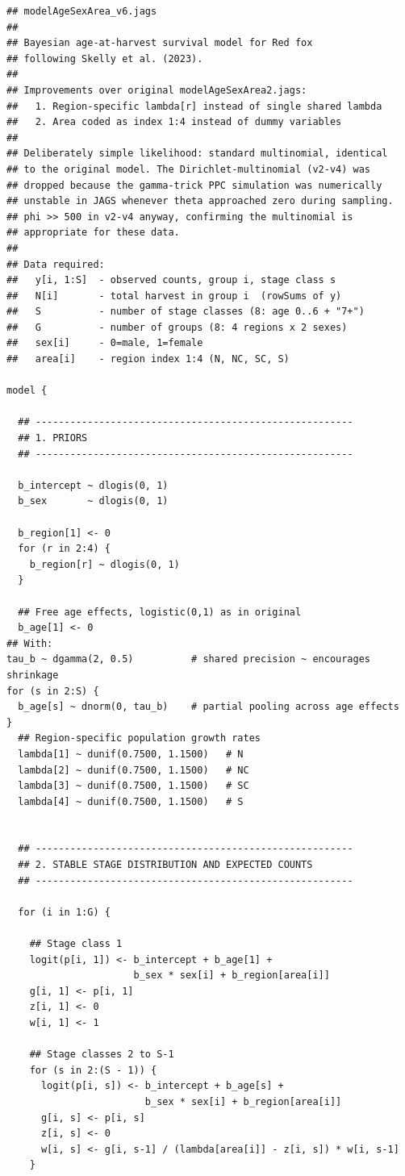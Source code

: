 \documentclass[12pt,a4paper,final,abstract=true,headings=small]{scrartcl}
\begin{document}
\begin{lstlisting}[language=JAGS]
## modelAgeSexArea_v6.jags
##
## Bayesian age-at-harvest survival model for Red fox
## following Skelly et al. (2023).
##
## Improvements over original modelAgeSexArea2.jags:
##   1. Region-specific lambda[r] instead of single shared lambda
##   2. Area coded as index 1:4 instead of dummy variables
##
## Deliberately simple likelihood: standard multinomial, identical
## to the original model. The Dirichlet-multinomial (v2-v4) was
## dropped because the gamma-trick PPC simulation was numerically
## unstable in JAGS whenever theta approached zero during sampling.
## phi >> 500 in v2-v4 anyway, confirming the multinomial is
## appropriate for these data.
##
## Data required:
##   y[i, 1:S]  - observed counts, group i, stage class s
##   N[i]       - total harvest in group i  (rowSums of y)
##   S          - number of stage classes (8: age 0..6 + "7+")
##   G          - number of groups (8: 4 regions x 2 sexes)
##   sex[i]     - 0=male, 1=female
##   area[i]    - region index 1:4 (N, NC, SC, S)

model {

  ## -------------------------------------------------------
  ## 1. PRIORS
  ## -------------------------------------------------------

  b_intercept ~ dlogis(0, 1)
  b_sex       ~ dlogis(0, 1)

  b_region[1] <- 0
  for (r in 2:4) {
    b_region[r] ~ dlogis(0, 1)
  }

  ## Free age effects, logistic(0,1) as in original
  b_age[1] <- 0
## With:
tau_b ~ dgamma(2, 0.5)          # shared precision ~ encourages shrinkage
for (s in 2:S) {
  b_age[s] ~ dnorm(0, tau_b)    # partial pooling across age effects
}
  ## Region-specific population growth rates
  lambda[1] ~ dunif(0.7500, 1.1500)   # N
  lambda[2] ~ dunif(0.7500, 1.1500)   # NC
  lambda[3] ~ dunif(0.7500, 1.1500)   # SC
  lambda[4] ~ dunif(0.7500, 1.1500)   # S


  ## -------------------------------------------------------
  ## 2. STABLE STAGE DISTRIBUTION AND EXPECTED COUNTS
  ## -------------------------------------------------------

  for (i in 1:G) {

    ## Stage class 1
    logit(p[i, 1]) <- b_intercept + b_age[1] +
                      b_sex * sex[i] + b_region[area[i]]
    g[i, 1] <- p[i, 1]
    z[i, 1] <- 0
    w[i, 1] <- 1

    ## Stage classes 2 to S-1
    for (s in 2:(S - 1)) {
      logit(p[i, s]) <- b_intercept + b_age[s] +
                        b_sex * sex[i] + b_region[area[i]]
      g[i, s] <- p[i, s]
      z[i, s] <- 0
      w[i, s] <- g[i, s-1] / (lambda[area[i]] - z[i, s]) * w[i, s-1]
    }


\end{lstlisting}
\end{document}
